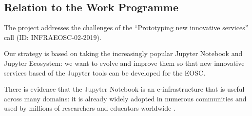 %

\subsection{Relation to the Work Programme}

The \TheProject project addresses the challenges of the ``Prototyping
new innovative services'' call (ID: INFRAEOSC-02-2019).

Our strategy is based on taking the increasingly popular Jupyter
Notebook and Jupyter Ecosystem: we want to evolve and improve them
so that new innovative services based of the Jupyter tools can be developed for
the EOSC.
\medskip

There is evidence that the Jupyter Notebook is an e-infrastructure
that is useful across many domains: it is already widely adopted in
numerous communities and used by millions of researchers and educators worldwide
\cite{jupyter-grant}.

